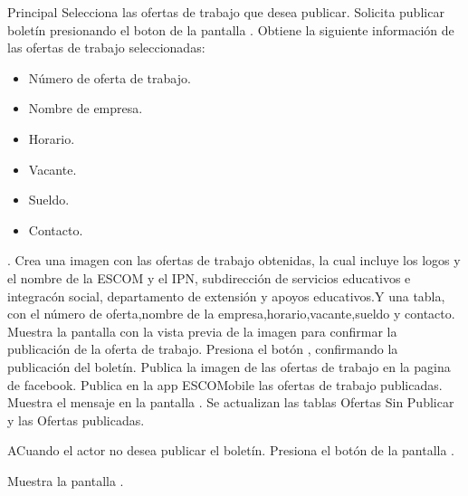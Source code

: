 	\begin{UCtrayectoria}{Principal}
	\UCpaso [\UCactor] Selecciona las ofertas de trabajo que desea publicar.
	\UCpaso[\UCactor] Solicita publicar boletín presionando el boton  de la pantalla .
	\UCpaso Obtiene la siguiente información de las ofertas de trabajo seleccionadas:
	\begin{itemize}
			\item Número de oferta de trabajo.
			\item Nombre de empresa.
			\item Horario.
			\item Vacante.
			\item Sueldo.
			\item Contacto.
		\end{itemize}
	.
	\UCpaso Crea una imagen con las ofertas de trabajo obtenidas, la cual incluye los logos y el nombre de la ESCOM y el IPN, subdirección de servicios educativos e integracón social, departamento de extensión y apoyos educativos.Y una tabla, con el número de oferta,nombre de la empresa,horario,vacante,sueldo y contacto.
	\UCpaso Muestra la pantalla   con la vista previa de la imagen para confirmar la publicación de la oferta de trabajo. 
\UCpaso [\UCactor] Presiona el botón , confirmando la publicación del boletín.  
	\UCpaso Publica la imagen de las ofertas de trabajo en la pagina de facebook.
	\UCpaso Publica en la app ESCOMobile las ofertas de trabajo publicadas.
	\UCpaso Muestra el mensaje  en la pantalla .
	\UCpaso Se actualizan las tablas Ofertas Sin Publicar y las Ofertas publicadas.  
	
	
	\end{UCtrayectoria}

\begin{UCtrayectoriaA}{A}{Cuando el actor no desea publicar el boletín.}
	\UCpaso [\UCactor] Presiona el botón   de la pantalla .

	\UCpaso Muestra la pantalla .   
\end{UCtrayectoriaA}
